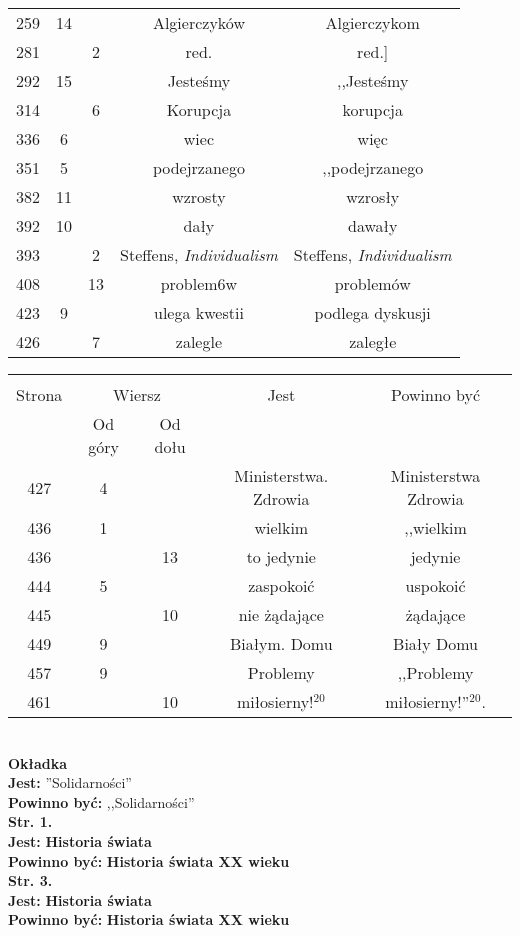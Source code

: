\documentclass[a4paper,11pt]{article}
\newcommand{\tb}{\textbf}
\newcommand{\noi}{\noindent}
\newcommand{\Str}[1]{\tb{Str. #1.}}
\newcommand{\Jest}{\tb{Jest: }}
\newcommand{\Pow}{\tb{Powinno być: }}
\begin{document}
\begin{center}
\begin{tabular}{|c|c|c|c|c|}
    259 & 14 & & Algierczyków & Algierczykom \\
    281 & & 2 & red. & red.] \\
    292 & 15 & & Jesteśmy & ,,Jesteśmy %
    \\
    314 & & 6 & Korupcja & korupcja \\
    336 & 6 & & wiec & więc \\
    351 & 5 & & podejrzanego & ,,podejrzanego %
    \\
    382 & 11 & & wzrosty & wzrosły \\
    392 & 10 & & dały & dawały \\
    393 & &  2 & Steffens,{ }{ }\emph{Individualism}
           & Steffens, \emph{Individualism} \\
    408 & & 13 & problem6w & problemów \\
    423 & 9 & & ulega kwestii & podlega dyskusji \\
    426 & & 7 & zalegle & zaległe \\ \hline
  \end{tabular}
\end{center}

\begin{center}
  \begin{tabular}{|c|c|c|c|c|}
    \hline
    & \multicolumn{2}{c|}{} & & \\
    Strona & \multicolumn{2}{c|}{Wiersz}& Jest & Powinno być \\ \cline{2-3}
    & Od góry & Od dołu & & \\ \hline
    427 & 4 & & Ministerstwa. Zdrowia & Ministerstwa Zdrowia \\
    436 & 1 & & wielkim & ,,wielkim %
    \\
    436 & & 13 & to jedynie & jedynie \\
    444 & 5 & & zaspokoić & uspokoić \\
    445 & & 10 & nie żądające & żądające \\
    449 & 9 & & Białym. Domu & Biały Domu \\
    457 & 9 & & Problemy & ,,Problemy %
    \\
    461 & & 10 & miłosierny!$^{ 20 }$ & miłosierny!''$^{ 20 }$. \\
    \hline
  \end{tabular}
\end{center}
\noi \\
\tb{Okładka} \\
\Jest ''Solidarności'' \\
\Pow  ,,Solidarności'' \\
\Str{1} \\
\Jest \tb{Historia świata} \\
\Pow  \tb{Historia świata XX wieku} \\
\Str{3} \\
\Jest \tb{Historia świata} \\
\Pow  \tb{Historia świata XX wieku} \\
\end{document}
